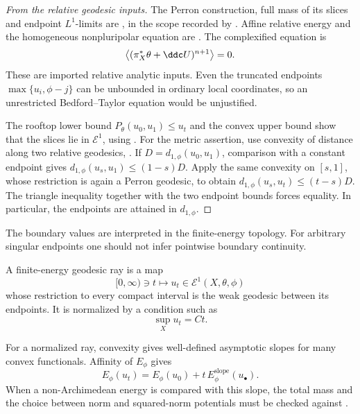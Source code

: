 \begin{proof}[From the relative geodesic inputs]
The Perron construction, full mass of its slices and endpoint
\(L^1\)-limits are \cite[Proposition~4.2.1]{XiaBook}, in the scope
recorded by .  Affine relative energy
and the homogeneous nonpluripolar equation are
\cite[Proposition~4.3.3, equations~(4.33)--(4.35)]{XiaBook}.
The complexified equation is
\[
              \bigl\langle(\pi_X^*\theta+\ddc U)^{n+1}\bigr\rangle=0.
\]
These are imported relative analytic inputs.  Even the truncated endpoints
\(\max\{u_i,\phi-j\}\) can be unbounded in ordinary local coordinates,
so an unrestricted Bedford--Taylor equation would be unjustified.

The rooftop lower bound \(P_\theta(u_0,u_1)\leq u_t\) and the convex
upper bound show that the slices lie in \(\mathcal E^1\), using
\cite[Propositions~3.1.21 and 3.1.22]{XiaBook}.  For the metric assertion,
use convexity of distance along two relative geodesics,
\cite[Proposition~4.3.5]{XiaBook}.  If
\(D=d_{1,\phi}(u_0,u_1)\), comparison with a constant endpoint gives
\(d_{1,\phi}(u_s,u_1)\leq(1-s)D\).  Apply the same convexity on
\([s,1]\), whose restriction is again a Perron geodesic, to obtain
\(d_{1,\phi}(u_s,u_t)\leq(t-s)D\).  The triangle inequality together
with the two endpoint bounds forces equality.  In particular, the
endpoints are attained in \(d_{1,\phi}\).
\end{proof}

The boundary values are interpreted in the finite-energy topology. For
arbitrary singular endpoints one should not infer pointwise boundary
continuity.

\begin{definition}
\label{def:appH-ray}
A finite-energy geodesic ray is a map
\[
                         [0,\infty)\ni t\longmapsto u_t
                         \in\mathcal E^1(X,\theta,\phi)
\]
whose restriction to every compact interval is the weak geodesic between
its endpoints. It is normalized by a condition such as
\[
                         \sup_Xu_t=Ct.
\]
\end{definition}

For a normalized ray, convexity gives well-defined asymptotic slopes for
many convex functionals. Affinity of \(E_\phi\) gives
\[
                         E_\phi(u_t)
                         =E_\phi(u_0)+t\,E_\phi^{\mathrm{slope}}(u_\bullet).
\]
When a non-Archimedean energy is compared with this slope, the total mass
and the choice between norm and squared-norm potentials must be checked
against .

